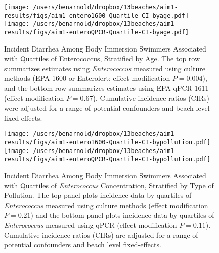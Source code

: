 \documentclass[12pt]{article}\usepackage[]{graphicx}\usepackage[]{color}
\begin{document}
\begin{landscape}
\begin{figure}
\begin{center}
\texttt{[image: /users/benarnold/dropbox/13beaches/aim1-results/figs/aim1-entero1600-Quartile-CI-byage.pdf]} \\
\texttt{[image: /users/benarnold/dropbox/13beaches/aim1-results/figs/aim1-enteroQPCR-Quartile-CI-byage.pdf]}
\caption{Incident Diarrhea Among Body Immersion Swimmers Associated with Quartiles of Enterococcus, Stratified by Age. The top row summarizes estimates using \textit{Enterococcus} measured using culture methods (EPA 1600 or Enterolert; effect modification $P=0.004$), and the bottom row summarizes estimates using EPA qPCR 1611 (effect modification $P=0.67$).  Cumulative incidence ratios (CIRs) were adjusted for a range of potential confounders and beach-level fixed effects.   \label{fig:Qenteroage}}
\end{center}
\end{figure}
\end{landscape}

\begin{figure}
\begin{center}
\texttt{[image: /users/benarnold/dropbox/13beaches/aim1-results/figs/aim1-entero1600-Quartile-CI-bypollution.pdf]} \\
\texttt{[image: /users/benarnold/dropbox/13beaches/aim1-results/figs/aim1-enteroQPCR-Quartile-CI-bypollution.pdf]}
\caption{Incident Diarrhea Among Body Immersion Swimmers Associated with Quartiles of \textit{Enterococcus} Concentration, Stratified by Type of Pollution. The top panel plots incidence data by quartiles of \textit{Enterococcus} measured using culture methods (effect modification $P=0.21$) and the bottom panel plots incidence data by quartiles of \textit{Enterococcus} measured using qPCR (effect modification $P=0.11$).  Cumulative incidence ratios (CIRs) are adjusted for a range of potential confounders and beach level fixed-effects.   \label{fig:Qenteropol}}
\end{center}
\end{figure}
\end{document}
